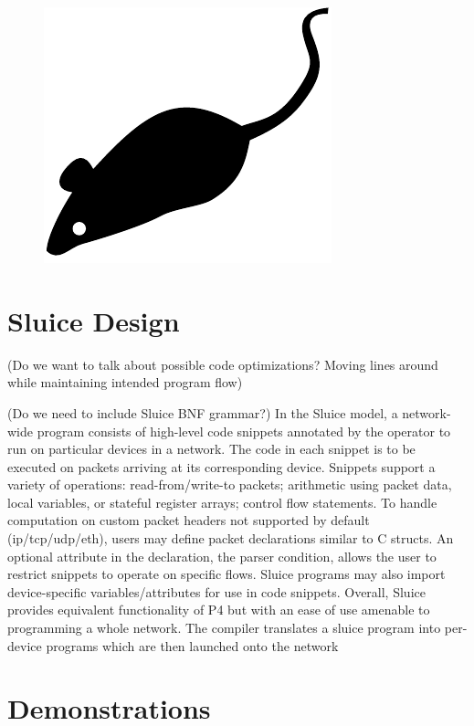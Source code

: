 \begin{figure}[tp]
\centering
\includegraphics{figures/mouse}
\caption{\blindtext}
\end{figure}

\section{Sluice Design}
(Do we want to talk about possible code optimizations? Moving lines around while maintaining intended program flow)

(Do we need to include Sluice BNF grammar?)
In the Sluice model, a network-wide program consists of high-level code snippets annotated by the operator to run on particular devices in a network. The code in each snippet is to be executed on packets arriving at its corresponding device. Snippets support a variety of operations: read-from/write-to packets; arithmetic using packet data, local variables, or stateful register arrays; control flow statements. To handle computation on custom packet headers not supported by default (ip/tcp/udp/eth), users may define packet declarations similar to C structs. An optional attribute in the declaration, the parser condition, allows the user to restrict snippets to operate on specific flows. Sluice programs may also import device-specific variables/attributes for use in code snippets. Overall, Sluice provides equivalent functionality of P4 but with an ease of use amenable to programming a whole network. The compiler translates a sluice program into per-device programs which are then launched onto the network



\section{Demonstrations}

